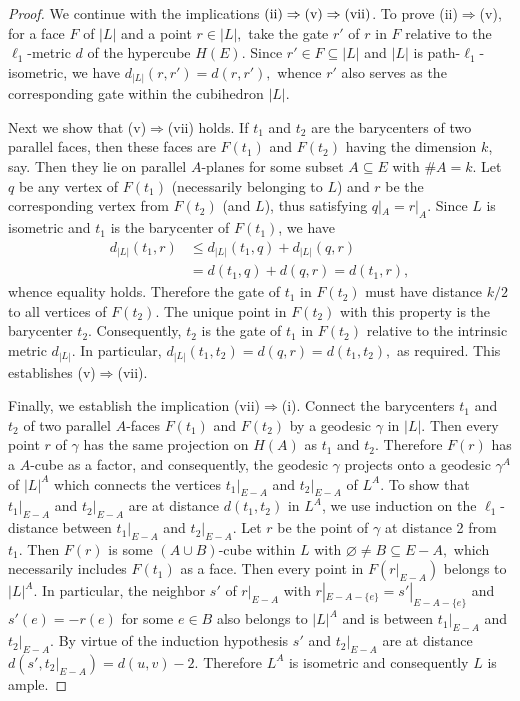 \documentclass[11pt,a4paper]{amsart}
\theoremstyle{definition}
\numberwithin{equation}{section}
\newcommand{\covectors}{\ensuremath{L}}
\newcommand{\HH}{\ensuremath{H}}
\newcommand{\FF}{\ensuremath{F}}
\begin{document}
\begin{proof}
We continue with the implications $\rm(ii)\Rightarrow \rm(v)\Rightarrow \rm(vii)$. To prove (ii)$\Rightarrow$(v),  for a face $\FF$ of $|\covectors|$ and a point $r\in |\covectors|,$ take the gate $r'$ of $r$ in $\FF$ relative to the $\ell_1$-metric $d$ of the hypercube $\HH(E)$.  Since $r'\in {\FF}\subseteq |\covectors|$ and $|\covectors|$ is path-$\ell_1$-isometric, we have $d_{|\covectors|}(r,r')=d(r,r'),$ whence $r'$ also serves as the corresponding gate within the cubihedron $|\covectors|.$

Next we show that (v)$\Rightarrow$(vii) holds. If $t_1$ and $t_2$ are the barycenters of two parallel faces, then these faces are $F(t_1)$ and $F(t_2)$ having the dimension $k$,
say. Then they lie on parallel $A$-planes for some subset $A\subseteq E$ with $\#A=k.$ Let $q$ be any vertex of $F(t_1)$ (necessarily belonging to $\covectors$) and $r$ be the
corresponding vertex from $F(t_2)$ (and $\covectors$), thus satisfying $q|_A=r|_A.$ Since $\covectors$ is isometric and $t_1$ is the barycenter of $F(t_1)$, we have
\begin{align*} d_{|\covectors|}(t_1,r)&\le d_{|\covectors|}(t_1,q)+d_{|\covectors|}(q,r)\\
&=d(t_1,q)+d(q,r)=d(t_1,r),
\end{align*}
whence equality holds. Therefore the gate of $t_1$ in $F(t_2)$ must have distance $k/2$ to all vertices of $F(t_2)$. The unique point in $F(t_2)$ with this property is
the barycenter $t_2$. Consequently, $t_2$ is the gate of $t_1$ in $F(t_2)$ relative to the intrinsic metric $d_{|\covectors|}$. In particular, $d_{|\covectors|}(t_1,t_2)=d(q,r)=d(t_1,t_2),$ as required. This establishes (v)$\Rightarrow$(vii).


Finally, we establish the implication (vii)$\Rightarrow$(i). Connect the barycenters $t_1$ and $t_2$ of two parallel $A$-faces $F(t_1)$ and $F(t_2)$ by a geodesic $\gamma$ in $|\covectors|.$ Then every point $r$ of $\gamma$ has the same projection on $\HH(A)$  as $t_1$ and $t_2$. Therefore $F(r)$ has a $A$-cube as a factor, and consequently, the geodesic $\gamma$ projects onto a geodesic
$\gamma^A$ of $|\covectors|^A$ which connects the vertices $t_1|_{E-A}$ and $t_2|_{E-A}$ of $\covectors^A$.  To show that $t_1|_{E-A}$ and $t_2|_{E-A}$ are at distance $d(t_1,t_2)$ in $\covectors^A$, we use induction on the $\ell_1$-distance between $t_1|_{E-A}$ and $t_2|_{E-A}.$ Let $r$ be the point of $\gamma$ at distance 2 from $t_1$. Then $F(r)$ is some $(A\cup B)$-cube within $\covectors$ with $\varnothing\ne B\subseteq E-A,$ which necessarily includes $F(t_1)$ as a face. Then every point in $F(r|_{E-A})$ belongs to $|\covectors|^A.$ In particular, the neighbor
$s'$ of $r|_{E-A}$ with $r|_{E-A-\{ e\}}=s'|_{E-A-\{ e\}}$ and $s'(e)=-r(e)$ for some $e\in B$ also belongs to $|\covectors|^A$ and is between $t_1|_{E-A}$ and $t_2|_{E-A}.$ By virtue of the induction hypothesis $s'$ and $t_2|_{E-A}$ are at distance $d(s',t_2|_{E-A})=d(u,v)-2.$ Therefore $\covectors^A$ is isometric and consequently $\covectors$ is ample.
\end{proof}
\end{document}
